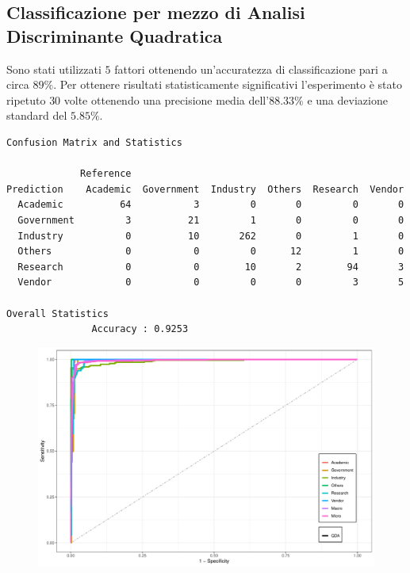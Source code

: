 \documentclass[11pt,a4paper]{article}
\begin{document}
\subsection{Classificazione per mezzo di Analisi Discriminante Quadratica}
Sono stati utilizzati $5$ fattori ottenendo un'accuratezza di classificazione
pari a circa $89\%$. Per ottenere risultati statisticamente significativi
l'esperimento \`e stato ripetuto $30$ volte ottenendo una precisione media
dell'$88.33\%$ e una deviazione standard del $5.85\%$.
\begin{lstlisting}[language=bash,basicstyle=\scriptsize,tabsize=2,frame = single]
 Confusion Matrix and Statistics

             Reference
Prediction    Academic  Government  Industry  Others  Research  Vendor
  Academic          64           3         0       0         0       0
  Government         3          21         1       0         0       0
  Industry           0          10       262       0         1       0
  Others             0           0         0      12         1       0
  Research           0           0        10       2        94       3
  Vendor             0           0         0       0         3       5

Overall Statistics
               Accuracy : 0.9253
\end{lstlisting}
\begin{figure}[H]
	\hspace{-2.5cm}
	\includegraphics[scale=.75]{imgs/QDA_ggplot.pdf}
\end{figure}
\end{document}
